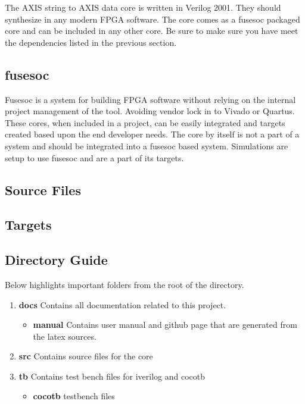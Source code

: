 \par
The AXIS string to AXIS data core is written in Verilog 2001. They should synthesize in any modern FPGA software. The core comes as a fusesoc packaged core and can be
included in any other core. Be sure to make sure you have meet the dependencies listed in the previous section.

\subsection{fusesoc}
\par
Fusesoc is a system for building FPGA software without relying on the internal project management of the tool. Avoiding vendor lock in to Vivado or Quartus.
These cores, when included in a project, can be easily integrated and targets created based upon the end developer needs. The core by itself is not a part of
a system and should be integrated into a fusesoc based system. Simulations are setup to use fusesoc and are a part of its targets.

\subsection{Source Files}



\subsection{Targets}



\subsection{Directory Guide}

\par
Below highlights important folders from the root of the directory.

\begin{enumerate}
  \item \textbf{docs} Contains all documentation related to this project.
    \begin{itemize}
      \item \textbf{manual} Contains user manual and github page that are generated from the latex sources.
    \end{itemize}
  \item \textbf{src} Contains source files for the core
  \item \textbf{tb} Contains test bench files for iverilog and cocotb
    \begin{itemize}
      \item \textbf{cocotb} testbench files
    \end{itemize}
\end{enumerate}

